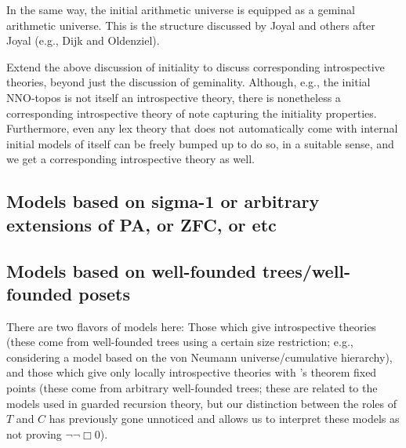 In the same way, the initial arithmetic universe is equipped as a geminal arithmetic universe. This is the structure discussed by Joyal and others after Joyal (e.g., Dijk and Oldenziel). 


\begin{TODOblock}
Extend the above discussion of initiality to discuss corresponding introspective theories, beyond just the discussion of geminality. Although, e.g., the initial NNO-topos is not itself an introspective theory, there is nonetheless a corresponding introspective theory of note capturing the initiality properties. Furthermore, even any lex theory that does not automatically come with internal initial models of itself can be freely bumped up to do so, in a suitable sense, and we get a corresponding introspective theory as well.
\end{TODOblock}

\subsection{Models based on sigma-1 or arbitrary extensions of PA, or ZFC, or etc}
\TODO

\subsection{Models based on well-founded trees/well-founded posets}
There are two flavors of models here: Those which give introspective theories (these come from well-founded trees using a certain size restriction; e.g., considering a model based on the von Neumann universe/cumulative hierarchy), and those which give only locally introspective theories with \Loeb's theorem fixed points (these come from arbitrary well-founded trees; these are related to the models used in guarded recursion theory, but our distinction between the roles of $T$ and $C$ has previously gone unnoticed and allows us to interpret these models as not proving $\lnot \lnot \Box 0$). \TODO